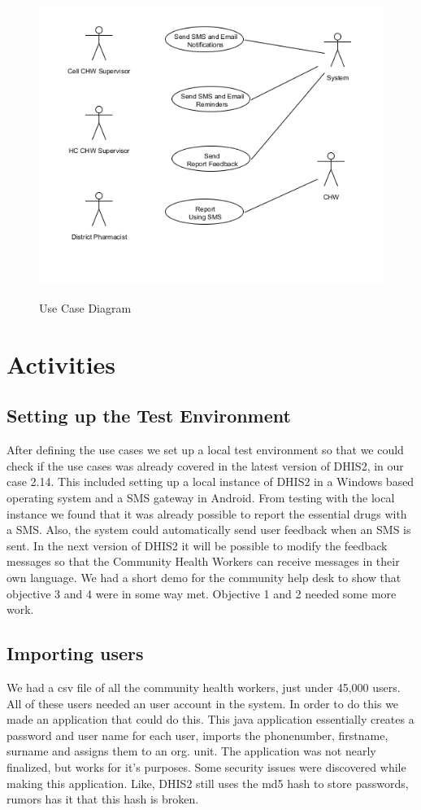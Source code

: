 \documentclass[a4paper]{report}
\begin{document}
\begin{figure}
\includegraphics[width=\columnwidth]{img/hmisReq.png}
\label{fig:use_case}
\caption{Use Case Diagram}
\end{figure}


\chapter{Activities}
\section{Setting up the Test Environment}
After defining the use cases we set up a local test environment so that we could check if the use cases was already covered in the latest version of DHIS2, in our case 2.14. This included setting up a local instance of DHIS2 in a Windows based operating system and a SMS gateway in Android.
From testing with the local instance we found that it was already possible to report the essential drugs with a SMS. Also, the system could automatically send user feedback when an SMS is sent.
In the next version of DHIS2 it will be possible to modify the feedback messages so that the Community Health Workers can receive messages in their own language.
We had a short demo for the community help desk to show that objective 3 and 4 were in some way met.
Objective 1 and 2 needed some more work.


\section{Importing users}
We had a csv file of all the community health workers, just under 45,000 users. All of these users needed an user account in the system. In order to do this we made an application that could do this.
This java application essentially creates a password and user name for each user, imports the phonenumber, firstname, surname and assigns them to an org. unit. The application was not nearly finalized, but works for it's purposes. Some security issues were discovered while making this application. Like, DHIS2 still uses the md5 hash to store passwords, rumors has it that this hash is broken.
\end{document}
